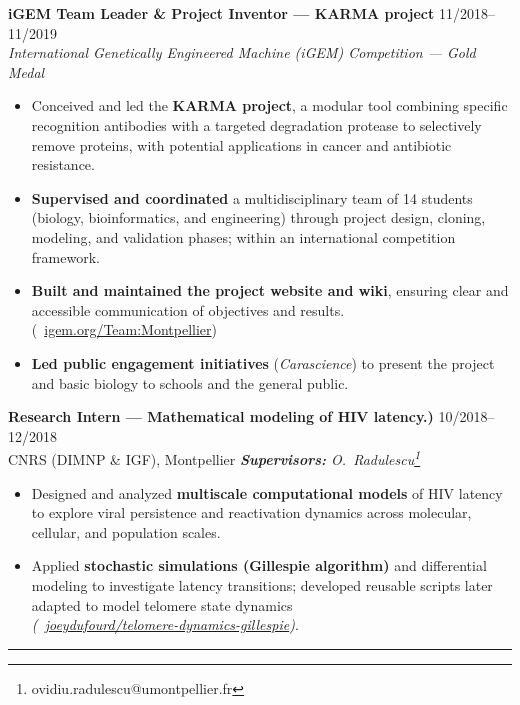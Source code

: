 \documentclass[11pt,a4paper]{article}
\begin{document}
\textbf{iGEM Team Leader \& Project Inventor --- KARMA project} \hfill 11/2018--11/2019\hspace{0.3em}\\
\emph{International Genetically Engineered Machine (iGEM) Competition --- Gold Medal}
\begin{itemize}
  \item Conceived and led the \textbf{KARMA project}, a modular tool combining specific recognition antibodies with a targeted degradation protease to selectively remove proteins, with potential applications in cancer and antibiotic resistance.
  \item \textbf{Supervised and coordinated} a multidisciplinary team of 14 students (biology, bioinformatics, and engineering) through project design, cloning, modeling, and validation phases; within an international competition framework.
  \item \textbf{Built and maintained the project website and wiki}, ensuring clear and accessible communication of objectives and results. (\faGlobe~\href{https://2019.igem.org/Team:Montpellier}{igem.org/Team:Montpellier})
  \item \textbf{Led public engagement initiatives} (\textit{Carascience}) to present the project and basic biology to schools and the general public.
\end{itemize}

\textbf{Research Intern --- Mathematical modeling of HIV latency.)} \hfill 10/2018--12/2018\hspace{0.3em}\\
CNRS (DIMNP \& IGF), Montpellier \hfill \textit{\textbf{Supervisors:} O.\ Radulescu\footnote{ovidiu.radulescu@umontpellier.fr}}
\begin{itemize}
  \item Designed and analyzed \textbf{multiscale computational models} of HIV latency to explore viral persistence and reactivation dynamics across molecular, cellular, and population scales.
  \item Applied \textbf{stochastic simulations (Gillespie algorithm)} and differential modeling to investigate latency transitions; developed reusable scripts later adapted to model telomere state dynamics
  \\\emph{(\faGithub~\href{https://github.com/joeydufourd/telomere-dynamics-gillespie}{joeydufourd/telomere-dynamics-gillespie})}.
\end{itemize}

\vspace{2pt}
\noindent\textcolor{sapin}{\rule{\textwidth}{0.6pt}}
\end{document}
